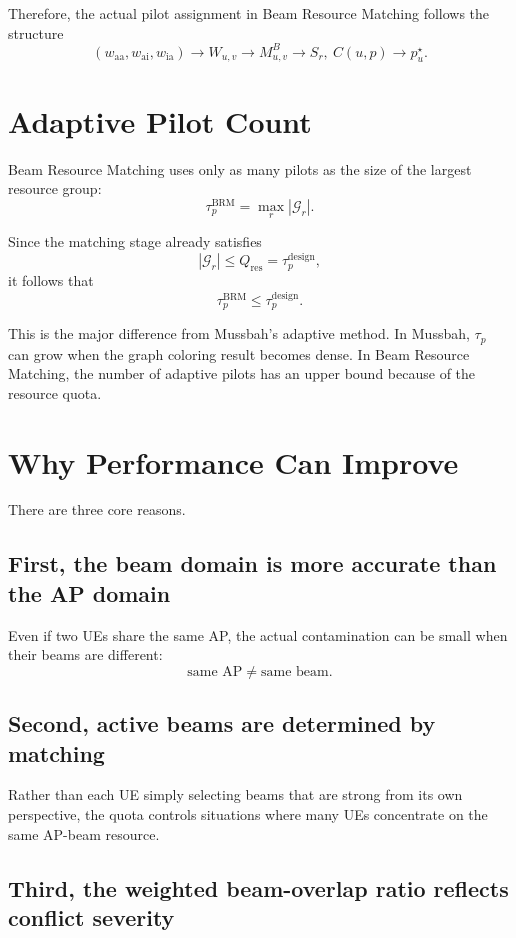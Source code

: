 \documentclass[11pt,a4paper]{article}
\newcommand{\taudesign}{\tau_{p}^{\mathrm{design}}}
\newcommand{\waa}{w_{\mathrm{aa}}}
\newcommand{\wai}{w_{\mathrm{ai}}}
\newcommand{\wia}{w_{\mathrm{ia}}}
\begin{document}
Therefore, the actual pilot assignment in Beam Resource Matching follows the structure
\[
    (\waa,\wai,\wia)
    \rightarrow
    W_{u,v}
    \rightarrow
    M_{u,v}^{B}
    \rightarrow
    S_r,\ C(u,p)
    \rightarrow
    p_u^{\star}.
\]

\section{Adaptive Pilot Count}

Beam Resource Matching uses only as many pilots as the size of the largest resource group:
\[
    \tau_{p}^{\mathrm{BRM}}=\max_{r}|\mathcal{G}_r|.
\]

Since the matching stage already satisfies
\[
    |\mathcal{G}_r|\le Q_{\mathrm{res}}=\taudesign,
\]
it follows that
\[
    \tau_{p}^{\mathrm{BRM}}\le \taudesign.
\]

This is the major difference from Mussbah's adaptive method. In Mussbah, \(\tau_p\) can grow when the graph coloring result becomes dense. In Beam Resource Matching, the number of adaptive pilots has an upper bound because of the resource quota.

\section{Why Performance Can Improve}

There are three core reasons.

\subsection*{First, the beam domain is more accurate than the AP domain}

Even if two UEs share the same AP, the actual contamination can be small when their beams are different:
\[
    \text{same AP} \neq \text{same beam}.
\]

\subsection*{Second, active beams are determined by matching}

Rather than each UE simply selecting beams that are strong from its own perspective, the quota controls situations where many UEs concentrate on the same AP-beam resource.

\subsection*{Third, the weighted beam-overlap ratio reflects conflict severity}
\end{document}
